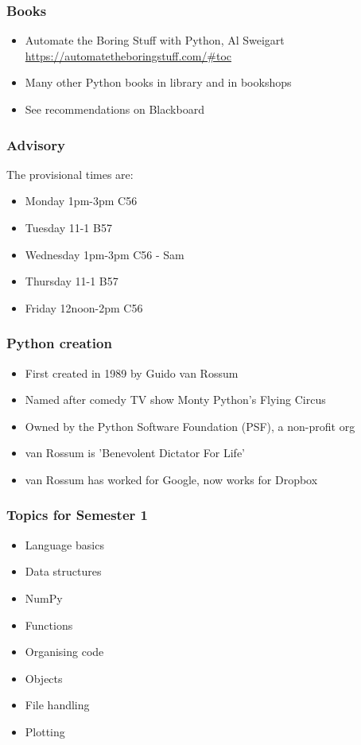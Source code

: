 \documentclass{beamer}
\begin{document}
\begin{frame}
\frametitle{Books}
\begin{itemize}
\item Automate the Boring Stuff with Python, Al Sweigart 
    \url{https://automatetheboringstuff.com/\#toc}
\item Many other Python books in library and in bookshops
\item See recommendations on Blackboard
\end{itemize}
\end{frame}

\begin{frame}
\frametitle{Advisory}

The provisional times are:
\begin{itemize}
\item Monday 1pm-3pm C56
\item Tuesday 11-1 B57
\item Wednesday 1pm-3pm C56 - Sam
\item Thursday 11-1 B57
\item Friday 12noon-2pm C56
\end{itemize}
\end{frame}


\begin{frame}
\frametitle{Python creation}
\begin{itemize}
\item First created in 1989 by Guido van Rossum
\item Named after comedy TV show Monty Python's Flying Circus
\item Owned by the Python Software Foundation (PSF), a non-profit org
\item van Rossum is 'Benevolent Dictator For Life'
\item van Rossum has worked for Google, now works for Dropbox
\end{itemize}
\end{frame}



\begin{frame}
\frametitle{Topics for Semester 1}
\begin{itemize}
\item Language basics
\item Data structures
\item NumPy
\item Functions
\item Organising code
\item Objects
\item File handling
\item Plotting
\end{itemize}
\end{frame}
\end{document}
